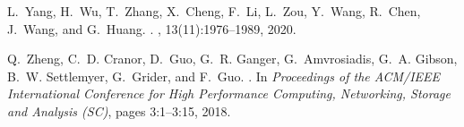 \documentclass[11pt,dvipdfmx]{article}
\begin{document}
\begin{thebibliography}{10}
\begin{small}
  L.~Yang, H.~Wu, T.~Zhang, X.~Cheng, F.~Li, L.~Zou, Y.~Wang, R.~Chen, J.~Wang,
    and G.~Huang.
  .
  , 13(11):1976--1989, 2020.
  
  Q.~Zheng, C.~D. Cranor, D.~Guo, G.~R. Ganger, G.~Amvrosiadis, G.~A. Gibson,
    B.~W. Settlemyer, G.~Grider, and F.~Guo.
  .
  \newblock In {\em Proceedings of the ACM/IEEE International Conference for High
    Performance Computing, Networking, Storage and Analysis (SC)}, pages
    3:1--3:15, 2018.

\end{small}
\end{thebibliography}
\end{document}
